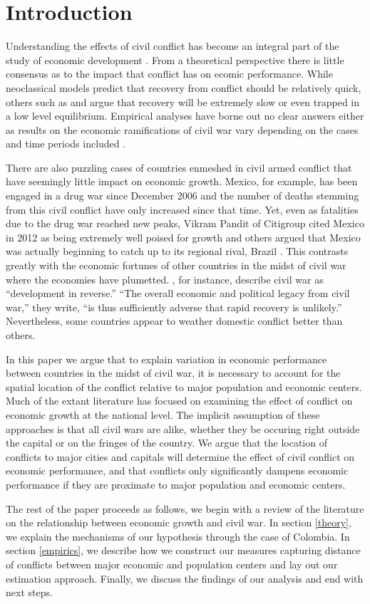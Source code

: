 \section{Introduction}
\label{intro}

Understanding the effects of civil conflict has become an integral part of the study of economic development \citep{serneels:verpoorten:2013}. From a theoretical perspective there is little consensus as to the impact that conflict has on ecomic performance. While neoclassical models predict that recovery from conflict should be relatively quick, others such as \citet{barro:martin:2004} and \citet{sachs:2006} argue that recovery will be extremely slow or even trapped in a low level equilibrium. Empirical analyses have borne out no clear answers either as results on the economic ramifications of civil war vary depending on the cases and time periods included \citep{kang:meernik:2005}. 

There are also puzzling cases of countries enmeshed in civil armed conflict that have seemingly little impact on economic growth. Mexico, for example, has been engaged in a drug war since December 2006 and the number of deaths stemming from this civil conflict have only increased since that time. Yet, even as fatalities due to the drug war reached new peaks, Vikram Pandit of Citigroup cited Mexico in 2012 as being extremely well poised for growth and others argued that Mexico was actually beginning to catch up to its regional rival, Brazil \citep{vardi:2012}. This contrasts greatly with the economic fortunes of other countries in the midst of civil war where the economies have plumetted. \cite{collier:elliott:etal:2003}, for instance, describe civil war as ``development in reverse.''  ``The overall economic and political legacy from civil war,'' they write, ``is thus sufficiently adverse that rapid recovery is unlikely.''  Nevertheless, some countries appear to weather domestic conflict better than others.  

In this paper we argue that to explain variation in economic performance between countries in the midst of civil war, it is necessary to account for the spatial location of the conflict relative to major population and economic centers. Much of the extant literature has focused on examining the effect of conflict on economic growth at the national level. The implicit assumption of these approaches is that all civil wars are alike, whether they be occuring right outside the capital or on the fringes of the country. We argue that the location of conflicts to major cities and capitals will determine the effect of civil conflict on economic performance, and that conflicts only significantly dampens economic performance if they are proximate to major population and economic centers. 

The rest of the paper proceeds as follows, we begin with a review of the literature on the relationship between economic growth and civil war. In section \ref{theory}, we explain the mechanisms of our hypothesis through the case of Colombia. In section \ref{empirics}, we describe how we construct our measures capturing distance of conflicts between major economic and population centers and lay out our estimation approach. Finally, we discuss the findings of our analysis and end with next steps. 